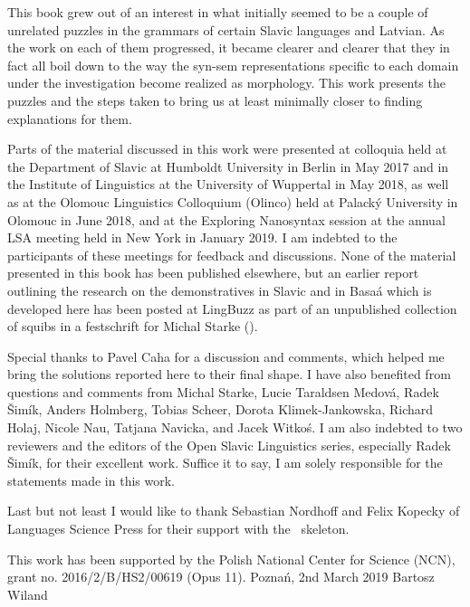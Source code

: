 
This book grew out of an interest in what initially seemed to be a couple of unrelated puzzles in the grammars of certain Slavic languages and Latvian. As the work on each of them progressed, it became clearer and clearer that they in fact all boil down to the way the syn-sem representations specific to each domain under the investigation become realized as morphology. This work presents the puzzles and the steps taken to bring us at least minimally closer to finding explanations for them.
\par
Parts of the material discussed in this work were presented at colloquia held at the Department of Slavic at Humboldt University in Berlin in May 2017 and in the Institute of Linguistics at the University of Wuppertal in May 2018, as well as at the Olomouc Linguistics Colloquium (Olinco) held at Palack\'y University in Olomouc in June 2018, and at the Exploring Nanosyntax session at the annual LSA meeting held in New York in January 2019. I am indebted to the participants of these meetings for feedback and discussions. None of the material presented in this book has been published elsewhere, but an earlier report outlining the research on the demonstratives in Slavic and in Basa\'a which is developed here has been posted at LingBuzz as part of an unpublished collection of squibs in a festschrift for Michal Starke (\citealt{WilandTUM}). 
\par 
Special thanks to  Pavel Caha for a discussion and comments, which helped me bring the solutions reported here to their final shape.
I have also benefited from questions and comments from  Michal Starke,   Lucie Taraldsen Medov\'a,   Radek \v{S}im\'ik,   Anders Holmberg,  Tobias Scheer,   Dorota Klimek-Jankowska,  Richard Holaj,  Nicole Nau,   Tatjana Navicka, and  Jacek Witko\'s. I am also indebted to two reviewers and the editors of the Open Slavic Linguistics series, especially Radek \v{S}im\'ik, for their excellent work. Suffice it to say, I am solely responsible for the statements made in this work. 
\par
Last but not least I would like to thank  Sebastian Nordhoff  and Felix Kopecky  of Languages Science Press for their support with the \XeLaTeX \ skeleton.
 \par
 This work has been supported by the Polish National Center for Science (NCN), grant no. 2016/2/B/HS2/00619 (Opus 11).
\bigbreak
\noindent 
Pozna\'n, 2nd March 2019 \hfill Bartosz Wiland


\begin{refsection}
\printbibliography[heading=subbibliography]
\end{refsection}


